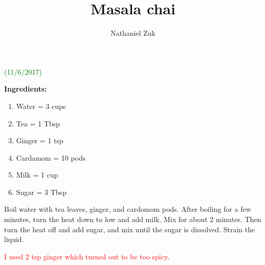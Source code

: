\documentclass[11pt]{article}
\title{Masala chai}
\author{Nathaniel Zuk}
\begin{document}
\maketitle

\textcolor{green}{(11/6/2017)}

\textbf{Ingredients:}

\begin{enumerate}
\item Water = 3 cups
\item Tea = 1 Tbsp
\item Ginger = 1 tsp
\item Cardamom = 10 pods
\item Milk = 1 cup
\item Sugar = 3 Tbsp
\end{enumerate}

Boil water with tea leaves, ginger, and cardomom pods.  After boiling for a few minutes, turn the heat down to low and add milk.  Mix for about 2 minutes.  Then turn the heat off and add sugar, and mix until the sugar is dissolved.  Strain the liquid.

\textcolor{red}{I used 2 tsp ginger which turned out to be too spicy.}
\end{document}
